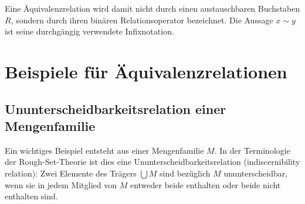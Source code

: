\documentclass[main.tex]{subfiles}
\begin{document}
Eine Äquivalenzrelation wird damit nicht durch einen austauschbaren
Buchstaben \(R\), sondern durch ihren binären Relationsoperator bezeichnet.
Die Aussage \(x\sim y\) ist seine durchgängig verwendete Infixnotation.

\chapter{Beispiele für Äquivalenzrelationen}

\section{Ununterscheidbarkeitsrelation einer Mengenfamilie}

Ein wichtiges Beispiel entsteht aus einer Mengenfamilie \(M\). In der
Terminologie der Rough-Set-Theorie ist dies eine
Ununterscheidbarkeitsrelation (indiscernibility relation): Zwei Elemente des
Trägers \(\bigcup M\) sind bezüglich \(M\) ununterscheidbar, wenn sie in jedem
Mitglied von \(M\) entweder beide enthalten oder beide nicht enthalten sind.


\begin{tabproofwide}
\end{tabproofwide}

\begin{tabproof}
\end{tabproof}
\end{document}
